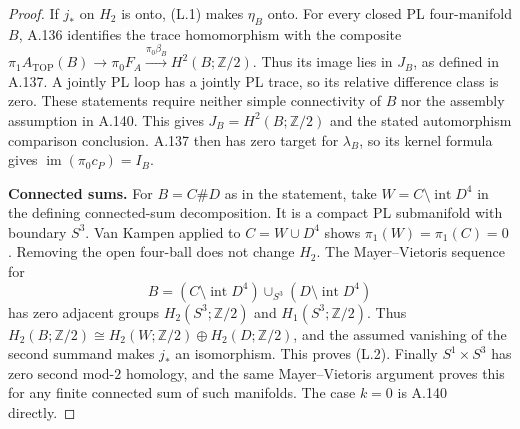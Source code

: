 \begin{proof}
If $j_*$ on $H_2$ is onto, (L.1) makes $\eta_B$ onto.
For every closed PL four-manifold $B$, A.136 identifies
the trace homomorphism with the composite
$\pi_1A_{\mathrm{TOP}}(B)\to\pi_0F_A
\xrightarrow{\pi_0\beta_B}H^2(B;\mathbb Z/2)$.
Thus its image lies in $J_B$, as defined in A.137.
A jointly PL loop has a jointly PL trace, so its
relative difference class is zero. These statements
require neither simple connectivity of $B$ nor the
assembly assumption in A.140. This gives
$J_B=H^2(B;\mathbb Z/2)$ and the stated automorphism
comparison conclusion. A.137 then has zero target for
$\lambda_B$, so its kernel formula gives
$\operatorname{im}(\pi_0c_P)=I_B$.

\textbf{Connected sums.}
For $B=C\#D$ as in the statement, take
$W=C\setminus\operatorname{int}D^4$ in the defining
connected-sum decomposition. It is a compact PL
submanifold with boundary $S^3$. Van Kampen applied
to $C=W\cup D^4$ shows $\pi_1(W)=\pi_1(C)=0$.
Removing the open four-ball does not change $H_2$.
The Mayer--Vietoris sequence for
\[
 B=(C\setminus\operatorname{int}D^4)
       \cup_{S^3}(D\setminus\operatorname{int}D^4)
\]
has zero adjacent groups $H_2(S^3;\mathbb Z/2)$ and
$H_1(S^3;\mathbb Z/2)$. Thus
$H_2(B;\mathbb Z/2)\cong H_2(W;\mathbb Z/2)
\oplus H_2(D;\mathbb Z/2)$, and the assumed vanishing
of the second summand makes $j_*$ an isomorphism.
This proves (L.2). Finally $S^1\times S^3$ has zero
second mod-$2$ homology, and the same Mayer--Vietoris
argument proves this for any finite connected sum of
such manifolds. The case $k=0$ is A.140 directly.
\end{proof}
